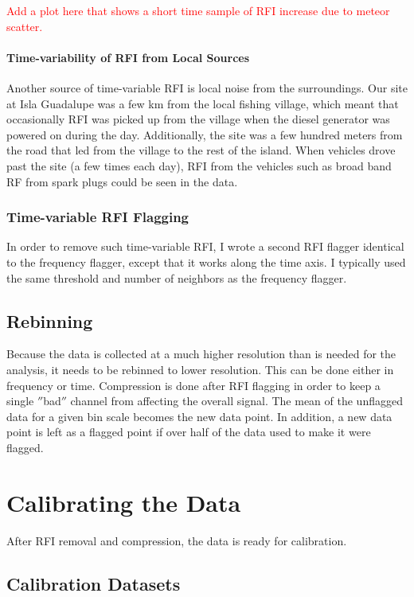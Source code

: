 \textcolor{red}{Add a plot here that shows a short time sample of RFI increase due to meteor scatter.}

\paragraph{Time-variability of RFI from Local Sources}
Another source of time-variable RFI is local noise from the surroundings. Our site at Isla Guadalupe was a few km from the local fishing village, which meant that occasionally RFI was picked up from the village when the diesel generator was powered on during the day. Additionally, the site was a few hundred meters from the road that led from the village to the rest of the island. When vehicles drove past the site (a few times each day), RFI from the vehicles such as broad band RF from spark plugs could be seen in the data. 

\subsubsection{Time-variable RFI Flagging}
In order to remove such time-variable RFI, I wrote a second RFI flagger identical to the frequency flagger, except that it works along the time axis. I typically used the same threshold and number of neighbors as the frequency flagger. 

\subsection{Rebinning}
Because the data is collected at a much higher resolution than is needed for the analysis, it needs to be rebinned to lower resolution. This can be done either in frequency or time. Compression is done after RFI flagging in order to keep a single $''$bad$''$ channel from affecting the overall signal. The mean of the unflagged data for a given bin scale becomes the new data point. In addition, a new data point is left as a flagged point if over half of the data used to make it were flagged. 

\section{Calibrating the Data}
After RFI removal and compression, the data is ready for calibration. 

\subsection{Calibration Datasets}

